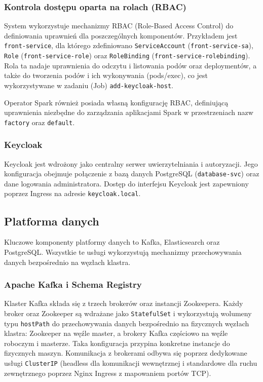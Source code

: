 \subsubsection{Kontrola dostępu oparta na rolach (RBAC)}
System wykorzystuje mechanizmy RBAC (Role-Based Access Control) do definiowania uprawnień dla poszczególnych komponentów. Przykładem jest \texttt{front-service}, dla którego zdefiniowano \texttt{ServiceAccount} (\texttt{front-service-sa}), \texttt{Role} (\texttt{front-service-role}) oraz \texttt{RoleBinding} (\texttt{front-service-rolebinding}). Rola ta nadaje uprawnienia do odczytu i listowania podów oraz deploymentów, a także do tworzenia podów i ich wykonywania (pods/exec), co jest wykorzystywane w zadaniu (Job) \texttt{add-keycloak-host}.

Operator Spark również posiada własną konfigurację RBAC, definiującą uprawnienia niezbędne do zarządzania aplikacjami Spark w przestrzeniach nazw \texttt{factory} oraz \texttt{default}.

\subsubsection{Keycloak}
Keycloak jest wdrożony jako centralny serwer uwierzytelniania i autoryzacji. Jego konfiguracja obejmuje połączenie z bazą danych PostgreSQL (\texttt{database-svc}) oraz dane logowania administratora. Dostęp do interfejsu Keycloak jest zapewniony poprzez Ingress na adresie \texttt{keycloak.local}.

\subsection{Platforma danych}

Kluczowe komponenty platformy danych to Kafka, Elasticsearch oraz PostgreSQL. Wszystkie te usługi wykorzystują mechanizmy przechowywania danych bezpośrednio na węzłach klastra.

\subsubsection{Apache Kafka i Schema Registry}
Klaster Kafka składa się z trzech brokerów oraz instancji Zookeepera. Każdy broker oraz Zookeeper są wdrażane jako \texttt{StatefulSet} i wykorzystują wolumeny typu \texttt{hostPath} do przechowywania danych bezpośrednio na fizycznych węzłach klastra: Zookeeper na węźle master, a brokery Kafka częściowo na węźle roboczym i masterze. Taka konfiguracja przypina konkretne instancje do fizycznych maszyn. Komunikacja z brokerami odbywa się poprzez dedykowane usługi \texttt{ClusterIP} (headless dla komunikacji wewnętrznej i standardowe dla ruchu zewnętrznego poprzez Nginx Ingress z mapowaniem portów TCP).

